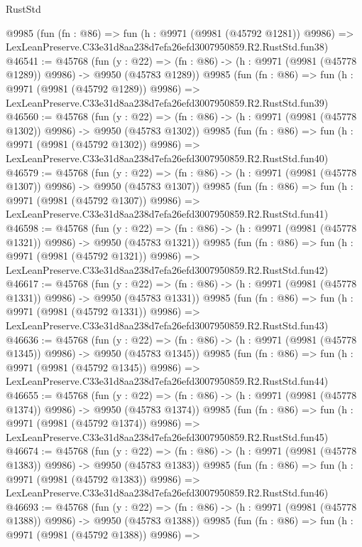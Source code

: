 \begin{lexlean}{RustStd}
\begin{coremodule}
    @9985
    (fun (fn : @86) =>
    fun (h : @9971 (@9981 (@45792 @1281)) @9986) =>
    LexLeanPreserve.C33e31d8aa238d7efa26efd3007950859.R2.RustStd.fun38)
@46541 := @45768
    (fun (y : @22) =>
    (fn : @86) -> (h : @9971 (@9981 (@45778 @1289)) @9986) -> @9950 (@45783 @1289))
    @9985
    (fun (fn : @86) =>
    fun (h : @9971 (@9981 (@45792 @1289)) @9986) =>
    LexLeanPreserve.C33e31d8aa238d7efa26efd3007950859.R2.RustStd.fun39)
@46560 := @45768
    (fun (y : @22) =>
    (fn : @86) -> (h : @9971 (@9981 (@45778 @1302)) @9986) -> @9950 (@45783 @1302))
    @9985
    (fun (fn : @86) =>
    fun (h : @9971 (@9981 (@45792 @1302)) @9986) =>
    LexLeanPreserve.C33e31d8aa238d7efa26efd3007950859.R2.RustStd.fun40)
@46579 := @45768
    (fun (y : @22) =>
    (fn : @86) -> (h : @9971 (@9981 (@45778 @1307)) @9986) -> @9950 (@45783 @1307))
    @9985
    (fun (fn : @86) =>
    fun (h : @9971 (@9981 (@45792 @1307)) @9986) =>
    LexLeanPreserve.C33e31d8aa238d7efa26efd3007950859.R2.RustStd.fun41)
@46598 := @45768
    (fun (y : @22) =>
    (fn : @86) -> (h : @9971 (@9981 (@45778 @1321)) @9986) -> @9950 (@45783 @1321))
    @9985
    (fun (fn : @86) =>
    fun (h : @9971 (@9981 (@45792 @1321)) @9986) =>
    LexLeanPreserve.C33e31d8aa238d7efa26efd3007950859.R2.RustStd.fun42)
@46617 := @45768
    (fun (y : @22) =>
    (fn : @86) -> (h : @9971 (@9981 (@45778 @1331)) @9986) -> @9950 (@45783 @1331))
    @9985
    (fun (fn : @86) =>
    fun (h : @9971 (@9981 (@45792 @1331)) @9986) =>
    LexLeanPreserve.C33e31d8aa238d7efa26efd3007950859.R2.RustStd.fun43)
@46636 := @45768
    (fun (y : @22) =>
    (fn : @86) -> (h : @9971 (@9981 (@45778 @1345)) @9986) -> @9950 (@45783 @1345))
    @9985
    (fun (fn : @86) =>
    fun (h : @9971 (@9981 (@45792 @1345)) @9986) =>
    LexLeanPreserve.C33e31d8aa238d7efa26efd3007950859.R2.RustStd.fun44)
@46655 := @45768
    (fun (y : @22) =>
    (fn : @86) -> (h : @9971 (@9981 (@45778 @1374)) @9986) -> @9950 (@45783 @1374))
    @9985
    (fun (fn : @86) =>
    fun (h : @9971 (@9981 (@45792 @1374)) @9986) =>
    LexLeanPreserve.C33e31d8aa238d7efa26efd3007950859.R2.RustStd.fun45)
@46674 := @45768
    (fun (y : @22) =>
    (fn : @86) -> (h : @9971 (@9981 (@45778 @1383)) @9986) -> @9950 (@45783 @1383))
    @9985
    (fun (fn : @86) =>
    fun (h : @9971 (@9981 (@45792 @1383)) @9986) =>
    LexLeanPreserve.C33e31d8aa238d7efa26efd3007950859.R2.RustStd.fun46)
@46693 := @45768
    (fun (y : @22) =>
    (fn : @86) -> (h : @9971 (@9981 (@45778 @1388)) @9986) -> @9950 (@45783 @1388))
    @9985
    (fun (fn : @86) =>
    fun (h : @9971 (@9981 (@45792 @1388)) @9986) =>

\end{coremodule}
\end{lexlean}
